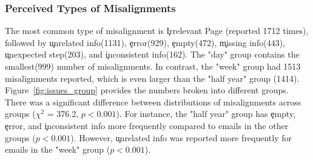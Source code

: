 \documentclass{sigchi}
\begin{document}
\subsubsection{Perceived Types of Misalignments}
The most common type of misalignment is \c{Irrelevant Page} (reported 1712 times), followed by \c{unrelated info}(1131), \c{error}(929), \c{empty}(472), \c{missing info}(443), \c{unexpected step}(203), and \c{inconsistent info}(162). The "day" group contains the smallest(999) number of misalignments. In contrast, the "week" group had 1513 misalignments reported, which is even larger than the "half year" group (1414). Figure~\ref{fig:issues_group} provides the numbers broken into different groups. There was a significant difference between distributions of misalignments across groups (${\chi}^2$ = 376.2, $p < 0.001$). For instance, the "half year" group has \c{empty}, \c{error}, and \c{inconsistent info} more frequently compared to emails in the other groups ($p < 0.001$). However, \c{unrelated info} was reported more frequently for emails in the "week" group ($p < 0.001$). 




\end{document}
